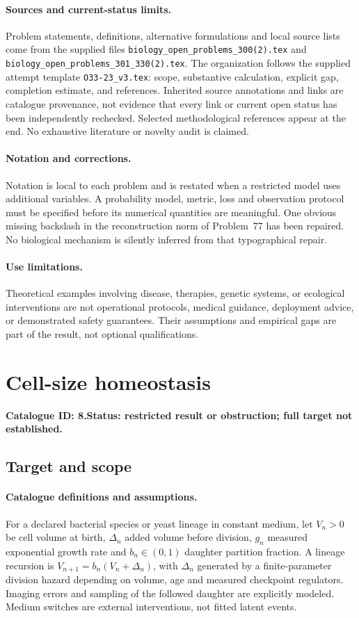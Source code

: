 \documentclass[11pt]{article}
\begin{document}
\paragraph{Sources and current-status limits.}
Problem statements, definitions, alternative formulations and local source lists
come from the supplied files
\texttt{biology\_open\_problems\_300(2).tex} and
\texttt{biology\_open\_problems\_301\_330(2).tex}.
The organization follows the supplied attempt template
\texttt{O33-23\_v3.tex}: scope, substantive calculation, explicit gap,
completion estimate, and references. Inherited source annotations and links are
catalogue provenance, not evidence that every link or current open status has
been independently rechecked. Selected methodological references appear at the
end. No exhaustive literature or novelty audit is claimed.

\paragraph{Notation and corrections.}
Notation is local to each problem and is restated when a restricted model uses
additional variables. A probability model, metric, loss and observation protocol
must be specified before its numerical quantities are meaningful. One obvious
missing backslash in the reconstruction norm of Problem~77 has been repaired.
No biological mechanism is silently inferred from that typographical repair.

\paragraph{Use limitations.}
Theoretical examples involving disease, therapies, genetic systems, or ecological
interventions are not operational protocols, medical guidance, deployment advice,
or demonstrated safety guarantees. Their assumptions and empirical gaps are part
of the result, not optional qualifications.

\setcounter{section}{7}
\section{Cell-size homeostasis}
\label{prob:008}
\noindent\textbf{Catalogue ID: 8.}\quad \textbf{Status: restricted result or obstruction; full target not established.}
\subsection{Target and scope}
\paragraph{Catalogue definitions and assumptions.}
For a declared bacterial species or yeast lineage in constant medium, let $V_n>0$ be cell volume at birth, $\Delta_n$ added volume before division, $g_n$ measured exponential growth rate and $b_n\in(0,1)$ daughter partition fraction. A lineage recursion is $V_{n+1}=b_n(V_n+\Delta_n)$, with $\Delta_n$ generated by a finite-parameter division hazard depending on volume, age and measured checkpoint regulators. Imaging errors and sampling of the followed daughter are explicitly modeled. Medium switches are external interventions, not fitted latent events.
\end{document}

